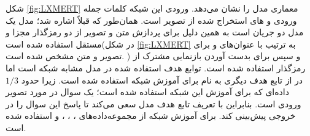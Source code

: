	شکل 
	\ref{fig:LXMERT}
	معماری مدل
	را نشان می‌دهد. ورودی این شبکه کلمات جمله ورودی و 
	های استخراج شده از تصویر است. همان‌طور که قبلاً اشاره شد؛ مدل
	یک مدل دو جریان است به همین دلیل برای پردازش متن و تصویر از دو رمزگذار مجزا و مستقل استفاده شده است(در شکل 
	\ref{fig:LXMERT}
	به ترتیب با عنوان‌های  
	و 
	برای تصویر و متن مشخص شده است.
	) و سپس برای بدست آوردن بازنمایی مشترک از رمزگذار
	استفاده شده است. توابع هدف استفاده شده در مدل
	مشابه شبکه 
	است اما در 
	از تابع هدف دیگری به نام 
	برای آموزش شبکه استفاده شده است. زیرا حدود $1/3$ داده‌ای که برای آموزش این شبکه استفاده شده است؛ یک سوال در مورد تصویر ورودی است. بنابراین با تعریف تابع هدف 
	مدل سعی ‌می‌کند تا پاسخ این سوال را در خروجی پیش‌بینی کند. برای آموزش شبکه
	از مجموعه‌داده‌های 
	،
	،
	،
	و
	استفاده شده است.

